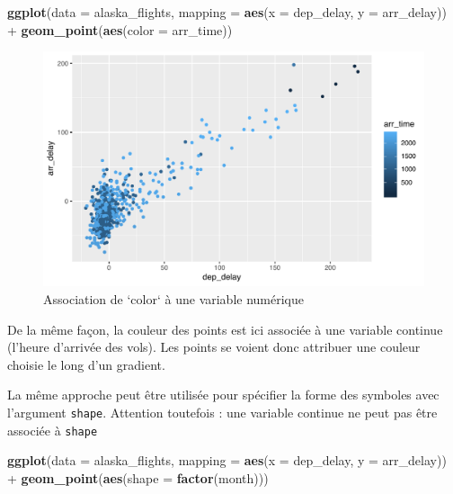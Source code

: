 \documentclass[a4paperpaper,]{article}
\newenvironment{Shaded}{\begin{snugshade}}{\end{snugshade}}
\newcommand{\DataTypeTok}[1]{\textcolor[rgb]{0.00,0.34,0.68}{#1}}
\newcommand{\KeywordTok}[1]{\textcolor[rgb]{0.12,0.11,0.11}{\textbf{#1}}}
\newcommand{\NormalTok}[1]{\textcolor[rgb]{0.12,0.11,0.11}{#1}}
\newcommand{\OperatorTok}[1]{\textcolor[rgb]{0.12,0.11,0.11}{#1}}
\newcommand{\StringTok}[1]{\textcolor[rgb]{0.75,0.01,0.01}{#1}}
\theoremstyle{definition}
\theoremstyle{definition}
\theoremstyle{definition}
\theoremstyle{remark}
\begin{document}
\begin{Shaded}
\begin{Highlighting}[]
\KeywordTok{ggplot}\NormalTok{(}\DataTypeTok{data =}\NormalTok{ alaska_flights, }\DataTypeTok{mapping =} \KeywordTok{aes}\NormalTok{(}\DataTypeTok{x =}\NormalTok{ dep_delay, }\DataTypeTok{y =}\NormalTok{ arr_delay)) }\OperatorTok{+}
\StringTok{  }\KeywordTok{geom_point}\NormalTok{(}\KeywordTok{aes}\NormalTok{(}\DataTypeTok{color =}\NormalTok{ arr_time))}
\end{Highlighting}
\end{Shaded}

\begin{figure}[htpb]

{\centering \includegraphics[width=0.9\linewidth]{figure/varcolor2-1} 

}

\caption{Association de `color` à une variable numérique}\label{fig:varcolor2}
\end{figure}

De la même façon, la couleur des points est ici associée à une variable
continue (l'heure d'arrivée des vols). Les points se voient donc
attribuer une couleur choisie le long d'un gradient.

La même approche peut être utilisée pour spécifier la forme des symboles
avec l'argument \texttt{shape}. Attention toutefois : une variable
continue ne peut pas être associée à \texttt{shape}

\begin{Shaded}
\begin{Highlighting}[]
\KeywordTok{ggplot}\NormalTok{(}\DataTypeTok{data =}\NormalTok{ alaska_flights, }\DataTypeTok{mapping =} \KeywordTok{aes}\NormalTok{(}\DataTypeTok{x =}\NormalTok{ dep_delay, }\DataTypeTok{y =}\NormalTok{ arr_delay)) }\OperatorTok{+}
\StringTok{  }\KeywordTok{geom_point}\NormalTok{(}\KeywordTok{aes}\NormalTok{(}\DataTypeTok{shape =} \KeywordTok{factor}\NormalTok{(month)))}
\end{Highlighting}
\end{Shaded}
\end{document}
